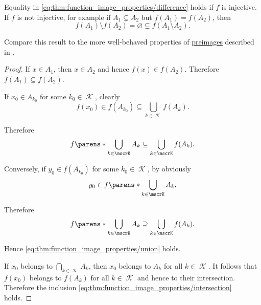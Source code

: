 \begin{proposition}
\begin{thmenum}
    Equality in \eqref{eq:thm:function_image_properties/difference} holds if \( f \) is injective. If \( f \) is not injective, for example if \( A_1 \subsetneq A_2 \) but \( f(A_1) = f(A_2) \), then
    \begin{equation*}
      f(A_1) \setminus f(A_2) = \varnothing \subsetneq f(A_1 \setminus A_2).
    \end{equation*}
  \end{thmenum}

  Compare this result to the more well-behaved properties of \hyperref[thm:function_properties/preimage]{preimages} described in .
\end{proposition}
\begin{proof}
   If \( x \in A_1 \), then \( x \in A_2 \) and hence \( f(x) \in f(A_2) \). Therefore \( f(A_1) \subseteq f(A_2) \).

   If \( x_0 \in A_{k_0} \) for some \( k_0 \in \mscrK \), clearly
  \begin{equation*}
    f(x_0) \in f(A_{k_0}) \subseteq \bigcup_{k \in \mscrK} f(A_k).
  \end{equation*}

  Therefore
  \begin{equation*}
    f\parens*{ \bigcup_{k \in \mscrK} A_k } \subseteq \bigcup_{k \in \mscrK} f(A_k).
  \end{equation*}

  Conversely, if \( y_0 \in f(A_{k_0}) \) for some \( k_0 \in \mscrK \), by  obviously
  \begin{equation*}
    y_0 \in f\parens*{ \bigcup_{k \in \mscrK} A_k }.
  \end{equation*}

  Therefore
  \begin{equation*}
    f\parens*{ \bigcup_{k \in \mscrK} A_k } \supseteq \bigcup_{k \in \mscrK} f(A_k).
  \end{equation*}

  Hence \eqref{eq:thm:function_image_properties/union} holds.

   If \( x_0 \) belongs to \( \bigcap_{k \in \mscrK} A_k \), then \( x_0 \) belongs to \( A_k \) for all \( k \in \mscrK \). It follows that \( f(x_0) \) belongs to \( f(A_k) \) for all \( k \in \mscrK \) and hence to their intersection. Therefore the inclusion \eqref{eq:thm:function_image_properties/intersection} holds.


\end{proof}
